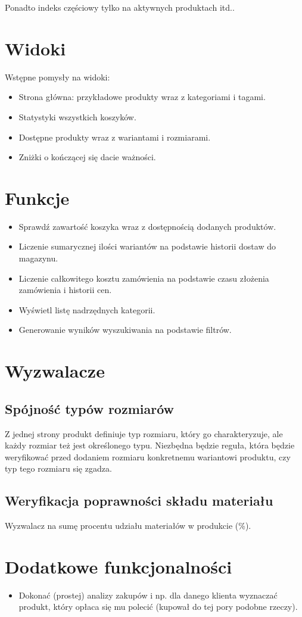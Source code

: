 Ponadto indeks częściowy tylko na aktywnych produktach itd..

\section*{Widoki}
Wstępne pomysły na widoki:
\begin{itemize}
    \item Strona główna: przykładowe produkty wraz z kategoriami i tagami.
    \item Statystyki wszystkich koszyków.
    \item Dostępne produkty wraz z wariantami i rozmiarami.
    \item Zniżki o kończącej się dacie ważności.
\end{itemize}

\section*{Funkcje}
\begin{itemize}
    \item Sprawdź zawartość koszyka wraz z dostępnością dodanych produktów.
    \item Liczenie sumarycznej ilości wariantów na podstawie historii dostaw do magazynu.
    \item Liczenie całkowitego kosztu zamówienia na podstawie czasu złożenia zamówienia i historii cen.
    \item Wyświetl listę nadrzędnych kategorii.
    \item Generowanie wyników wyszukiwania na podstawie filtrów.
\end{itemize}

\section*{Wyzwalacze}
\subsection*{Spójność typów rozmiarów}
Z jednej strony produkt definiuje typ rozmiaru, który go charakteryzuje, ale każdy rozmiar też jest określonego typu. Niezbędna będzie reguła, która będzie weryfikować przed dodaniem rozmiaru konkretnemu wariantowi produktu, czy typ tego rozmiaru się zgadza.

\subsection*{Weryfikacja poprawności składu materiału}
Wyzwalacz na sumę procentu udziału materiałów w produkcie (\%).

\section*{Dodatkowe funkcjonalności}
\begin{itemize}
    \item Dokonać (prostej) analizy zakupów i np. dla danego klienta wyznaczać produkt, który opłaca się mu polecić (kupował do tej pory podobne rzeczy).
\end{itemize}




